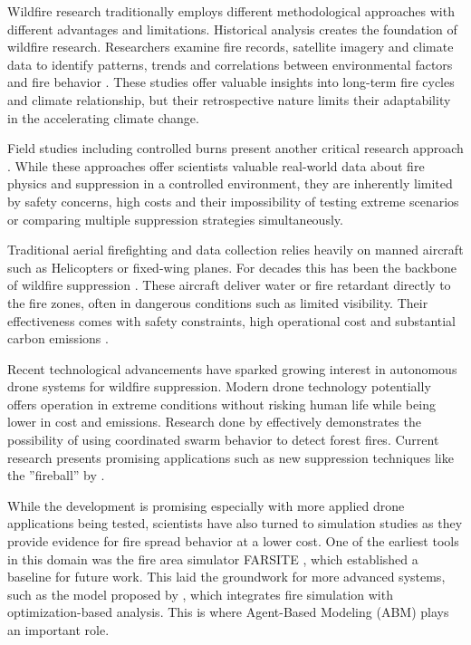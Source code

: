 \documentclass[twoside]{article}
\begin{document}
Wildfire research traditionally employs different methodological approaches with different advantages and limitations. Historical analysis creates the foundation of wildfire research. Researchers examine fire records, satellite imagery and climate data to identify patterns, trends and correlations between environmental factors and fire behavior \citep{copernicus-wildfires,IPCC2023}. These studies offer valuable insights into long-term fire cycles and climate relationship, but their retrospective nature limits their adaptability in the accelerating climate change. 

Field studies including controlled burns present another critical research approach \citep{wildland}. While these approaches offer scientists valuable real-world data about fire physics and suppression in a controlled environment, they are inherently limited by safety concerns, high costs and their impossibility of testing extreme scenarios or comparing multiple suppression strategies simultaneously.

Traditional aerial firefighting and data collection relies heavily on manned aircraft such as Helicopters or fixed-wing planes. For decades this has been the backbone of wildfire suppression \citep{janney2012airtankers}. These aircraft deliver water or fire retardant directly to the fire zones, often in dangerous conditions such as limited visibility. Their effectiveness comes with safety constraints, high operational cost and substantial carbon emissions \citep{spicerRapidMeasurementEmissions2009}.

Recent technological advancements have sparked growing interest in autonomous drone systems for wildfire suppression. Modern drone technology potentially offers operation in extreme conditions without risking human life while being lower in cost and emissions. Research done by \citet{Yan2024} effectively demonstrates the possibility of using coordinated swarm behavior to detect forest fires. Current research presents promising applications such as new suppression techniques like the ''fireball'' by \citet{fireBalls}.

While the development is promising especially with more applied drone applications being tested, scientists have also turned to simulation studies as they provide evidence for fire spread behavior at a lower cost. One of the earliest tools in this domain was the fire area simulator FARSITE \citep{FARSITE}, which established a baseline for future work. This laid the groundwork for more advanced systems, such as the model proposed by \citet{integrated_simulation}, which integrates fire simulation with optimization-based analysis.
This is where Agent-Based Modeling (ABM) plays an important role.
\end{document}
